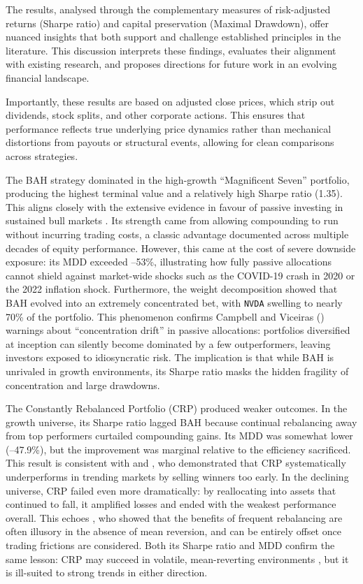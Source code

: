 \documentclass[12pt,a4paper]{report}
\begin{document}
The results, analysed through the complementary measures of risk-adjusted returns (Sharpe ratio) and capital preservation (Maximal Drawdown), offer nuanced insights that both support and challenge established principles in the literature. This discussion interprets these findings, evaluates their alignment with existing research, and proposes directions for future work in an evolving financial landscape.

Importantly, these results are based on adjusted close prices, which strip out dividends, stock splits, and other corporate actions. This ensures that performance reflects true underlying price dynamics rather than mechanical distortions from payouts or structural events, allowing for clean comparisons across strategies.

The BAH strategy dominated in the high-growth “Magnificent Seven” portfolio, producing the highest terminal value and a relatively high Sharpe ratio (1.35). This aligns closely with the extensive evidence in favour of passive investing in sustained bull markets \citep{Siegel1998, Bogle1999}. Its strength came from allowing compounding to run without incurring trading costs, a classic advantage documented across multiple decades of equity performance. However, this came at the cost of severe downside exposure: its MDD exceeded –53\%, illustrating how fully passive allocations cannot shield against market-wide shocks such as the COVID-19 crash in 2020 or the 2022 inflation shock. Furthermore, the weight decomposition showed that BAH evolved into an extremely concentrated bet, with \texttt{NVDA} swelling to nearly 70\% of the portfolio. This phenomenon confirms Campbell and Viceira\textquotesingle s (\citeyear{Campbell2002}) warnings about “concentration drift” in passive allocations: portfolios diversified at inception can silently become dominated by a few outperformers, leaving investors exposed to idiosyncratic risk. The implication is that while BAH is unrivaled in growth environments, its Sharpe ratio masks the hidden fragility of concentration and large drawdowns.

The Constantly Rebalanced Portfolio (CRP) produced weaker outcomes. In the growth universe, its Sharpe ratio lagged BAH because continual rebalancing away from top performers curtailed compounding gains. Its MDD was somewhat lower (–47.9\%), but the improvement was marginal relative to the efficiency sacrificed. This result is consistent with \citet{Perold1988} and \citet{French2008}, who demonstrated that CRP systematically underperforms in trending markets by selling winners too early. In the declining universe, CRP failed even more dramatically: by reallocating into assets that continued to fall, it amplified losses and ended with the weakest performance overall. This echoes \citet{DeMiguel2009}, who showed that the benefits of frequent rebalancing are often illusory in the absence of mean reversion, and can be entirely offset once trading frictions are considered. Both its Sharpe ratio and MDD confirm the same lesson: CRP may succeed in volatile, mean-reverting environments \citep{Ilmanen2011}, but it is ill-suited to strong trends in either direction.
\end{document}
